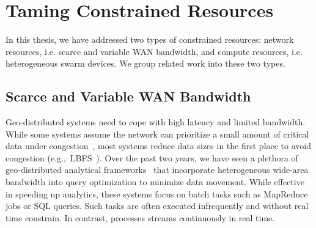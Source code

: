 \documentclass[thesis.tex]{subfiles}
\begin{document}


\section{Taming Constrained Resources}
\label{sec:taming-constr-reso}

In this thesis, we have addressed two types of constrained resources: network
resources, i.e. scarce and variable WAN bandwidth, and compute resources,
i.e. heterogeneous swarm devices. We group related work into these two types.

\subsection{Scarce and Variable WAN Bandwidth}
\label{sec:scarce-variable-wan}

Geo-distributed systems need to cope with high latency and limited
bandwidth. While some systems assume the network can prioritize a small amount
of critical data under congestion~\cite{cho2012surviving}, most systems reduce
data sizes in the first place to avoid congestion
(e.g.,~LBFS~\cite{muthitacharoen2001low}). Over the past two years, we have seen
a plethora of geo-distributed analytical
frameworks~\cite{vulimiri2015wananlytics, vulimiri2015global, pu2015low,
  kloudas2015pixida, viswanathan2016clarinet} that incorporate heterogeneous
wide-area bandwidth into query optimization to minimize data movement. While
effective in speeding up analytics, these systems focus on batch tasks such as
MapReduce jobs or SQL queries. Such tasks are often executed infrequently and
without real time constrain. In contrast, \sysname{} processes streams
continuously in real time.
\end{document}
